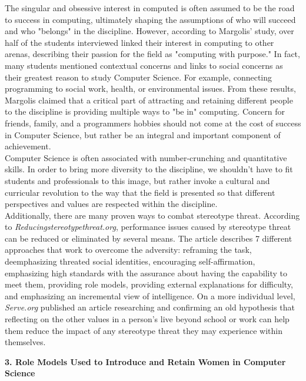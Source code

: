 \documentclass[12pt]{article}
\begin{document}
		The singular and obsessive interest in computed is often assumed to be the road to success in computing, ultimately shaping the assumptions of who will succeed and who "belongs" in the discipline. However, according to Margolis' study, over half of the students interviewed linked their interest in computing to other arenas, describing their passion for the field as "computing with purpose." In fact, many students mentioned contextual concerns and links to social concerns as their greatest reason to study Computer Science. For example, connecting programming to social work, health, or environmental issues. From these results, Margolis claimed that a critical part of attracting and retaining different people to the discipline is providing multiple ways to "be in" computing. Concern for friends, family, and a programmers hobbies should not come at the cost of success in Computer Science, but rather be an integral and important component of achievement. \\
		
		Computer Science is often associated with number-crunching and quantitative skills. In order to bring more diversity to the discipline, we shouldn't have to fit students and professionals to this image, but rather invoke a cultural and curricular revolution to the way that the field is presented so that different perspectives and values are respected within the discipline. \\
		
		Additionally, there are many proven ways to combat stereotype threat. According to \textit{Reducingstereotypethreat.org}, performance issues caused by stereotype threat can be reduced or eliminated by several means. The article describes 7 different approaches that work to overcome the adversity: reframing the task, deemphasizing threated social identities, encouraging self-affirmation, emphasizing high standards with the assurance about having the capability to meet them, providing role models, providing external explanations for difficulty, and emphasizing an incremental view of intelligence\cite{threat}. On a more individual level, \textit{Serve.org} published an article researching and confirming an old hypothesis that reflecting on the other values in a person's live beyond school or work can help them reduce the impact of any stereotype threat they may experience within themselves\cite{believe}.\\
	 	
	 	\pagebreak
	 					
	\textbf{3. Role Models Used to Introduce and Retain Women in Computer Science}\\
	
\end{document}

